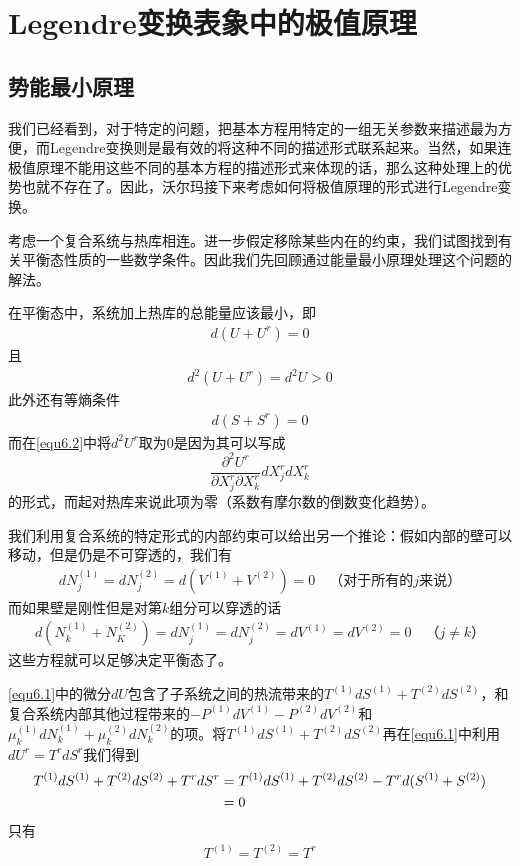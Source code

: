 \chapter{Legendre变换表象中的极值原理}
\label{chap6}

\section{势能最小原理}\label{sec6-1}

我们已经看到，对于特定的问题，把基本方程用特定的一组无关参数来描述最为方便，而Legendre变换则是最有效的将这种不同的描述形式联系起来。当然，如果连极值原理不能用这些不同的基本方程的描述形式来体现的话，那么这种处理上的优势也就不存在了。因此，沃尔玛接下来考虑如何将极值原理的形式进行Legendre变换。

考虑一个复合系统与热库相连。进一步假定移除某些内在的约束，我们试图找到有关平衡态性质的一些数学条件。因此我们先回顾通过能量最小原理处理这个问题的解法。

在平衡态中，系统加上热库的总能量应该最小，即
\begin{align}\label{equ6.1}
d(U+U^r)=0
\end{align}
且
\begin{align}\label{equ6.2}
d^2(U+U^r)=d^2U>0
\end{align}
此外还有等熵条件
\begin{align}\label{equ6.3}
d(S+S^r)=0
\end{align}
而在\eqref{equ6.2}中将$d^2U^r$取为0是因为其可以写成
\[\frac{\partial^2 U^r}{\partial X_j^r\partial X_k^r}dX_j^rdX_k^r \]
的形式，而起对热库来说此项为零（系数有摩尔数的倒数变化趋势）。

我们利用复合系统的特定形式的内部约束可以给出另一个推论：假如内部的壁可以移动，但是仍是不可穿透的，我们有
\begin{align}\label{equ6.4}
dN_j^{(1)}=dN_j^{(2)}=d(V^{(1)}+V^{(2)})=0 \quad\text{（对于所有的$j$来说）}
\end{align}
而如果壁是刚性但是对第$k$组分可以穿透的话
\begin{align}\label{equ6.5}
d(N_k^{(1)}+N_K^{(2)})=dN_j^{(1)}=dN_j^{(2)}=dV^{(1)}=dV^{(2)}=0 \quad\text{（$j\neq k$）}
\end{align}
这些方程就可以足够决定平衡态了。

\eqref{equ6.1}中的微分$dU$包含了子系统之间的热流带来的$T^{(1)}dS^{(1)}+T^{(2)}dS^{(2)}$，和复合系统内部其他过程带来的$-P^{(1)}dV^{(1)}-P^{(2)}dV^{(2)}$和$\mu_k^{(1)}dN_k^{(1)}+\mu_k^{(2)}dN_k^{(2)}$的项。将$T^{(1)}dS^{(1)}+T^{(2)}dS^{(2)}$再在\eqref{equ6.1}中利用$dU^r=T^rdS^r$我们得到
\begin{align}\notag{}
T^{(1)}dS^{(1)}+T^{(2)}dS^{(2)}+T^rdS^r&=T^{(1)}dS^{(1)}+T^{(2)}dS^{(2)}-T^rd(S^{(1)}+S^{(2)})\\
&=0\label{equ6.6}
\end{align}
只有
\begin{align}\label{equ6.7}
T^{(1)}=T^{(2)}=T^r
\end{align}

